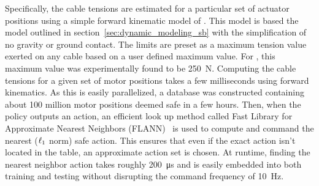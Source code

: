 
Specifically, the cable tensions are estimated for a particular set of actuator positions using a simple forward kinematic model of \SB{}.
This model is based the model outlined in section~\ref{sec:dynamic_modeling_sb} with the simplification of no gravity or ground contact.
The limits are preset as a maximum tension value exerted on any cable based on a user defined maximum value.
For \SB{}, this maximum value was experimentally found to be \SI{250}{\newton}.
Computing the cable tensions for a given set of motor positions takes a few milliseconds using forward
kinematics. As this is easily parallelized, a database was constructed containing
about 100 million motor positions deemed safe in a few hours.
Then, when the policy outputs an action, an efficient look up method called Fast
Library for Approximate Nearest Neighbors (FLANN)~\cite{flannsoftware} is used to compute
and command the nearest ($\ell_1$ norm) safe action.
This ensures that even if the exact action isn't located in the table, an approximate action set is chosen.
At runtime, finding the nearest neighbor action takes roughly \SI{200}{\micro\second} and is
easily embedded into both training and testing without disrupting the command
frequency of \SI{10}{\hertz}.


